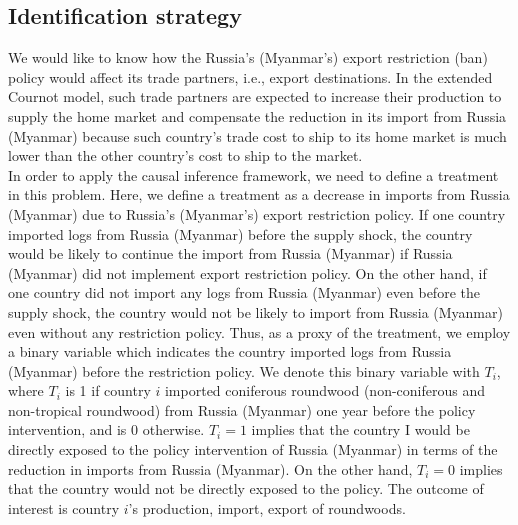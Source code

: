 \documentclass[a4paper,12pt]{article}
\begin{document}
\subsection{Identification strategy}

We would like to know how the Russia's (Myanmar's) export restriction (ban) policy would affect its trade partners, i.e., export destinations. In the extended Cournot model, such trade partners are expected to increase their production to supply the home market and compensate the reduction in its import from Russia (Myanmar) because such country's trade cost to ship to its home market is much lower than the other country's cost to ship to the market. \\

In order to apply the causal inference framework, we need to define a treatment in this problem. Here, we define a treatment as a decrease in imports from Russia (Myanmar) due to Russia's (Myanmar's) export restriction policy. If one country imported logs from Russia (Myanmar) before the supply shock, the country would be likely to continue the import from Russia (Myanmar) if Russia (Myanmar) did not implement export restriction policy. On the other hand, if one country did not import any logs from Russia (Myanmar) even before the supply shock, the country would not be likely to import from Russia (Myanmar) even without any restriction policy. Thus, as a proxy of the treatment, we employ a binary variable which indicates the country imported logs from Russia (Myanmar) before the restriction policy. We denote this binary variable with $T_i$, where $T_i$ is 1 if country $i$ imported coniferous roundwood (non-coniferous and non-tropical roundwood) from Russia (Myanmar) one year before the policy intervention, and is 0 otherwise. $T_i = 1$ implies that the country I would be directly exposed to the policy intervention of Russia (Myanmar) in terms of the reduction in imports from Russia (Myanmar). On the other hand, $T_i = 0$ implies that the country would not be directly exposed to the policy. The outcome of interest is country $i$'s production, import, export of roundwoods.\\
\end{document}
